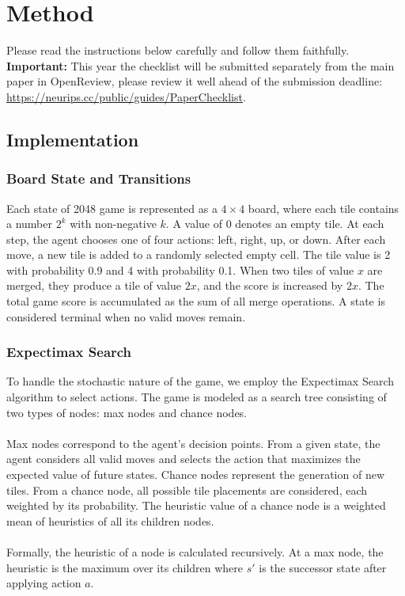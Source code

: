 \documentclass{article}
\begin{document}
\section{Method}


Please read the instructions below carefully and follow them faithfully. \textbf{Important:} This year the checklist will be submitted separately from the main paper in OpenReview, please review it well ahead of the submission deadline: \url{https://neurips.cc/public/guides/PaperChecklist}.


\subsection{Implementation}

\subsubsection{Board State and Transitions}

Each state of 2048 game is represented as a $4 \times 4$ board, where each tile contains a number $2^k$ with
non-negative $k$. A value of 0 denotes an empty tile. At each step, the agent chooses one of four actions:
left, right, up, or down. After each move, a new tile is added to a randomly selected empty cell.
The tile value is 2 with probability 0.9 and 4 with probability 0.1. When two tiles of value $x$ are merged,
they produce a tile of value $2x$, and the score is increased by $2x$. The total game score is accumulated
as the sum of all merge operations. A state is considered terminal when no valid moves remain.

\subsubsection{Expectimax Search}

To handle the stochastic nature of the game, we employ the Expectimax Search algorithm to select actions.
The game is modeled as a search tree consisting of two types of nodes: max nodes and chance nodes.
\\
\\
Max nodes correspond to the agent's decision points. From a given state, the agent considers all valid moves
and selects the action that maximizes the expected value of future states. Chance nodes represent the generation
of new tiles. From a chance node, all possible tile placements are considered, each weighted by its probability.
The heuristic value of a chance node is a weighted mean of heuristics of all its children nodes.
\\
\\
Formally, the heuristic of a node is calculated recursively. At a max node, the heuristic is the maximum over
its children where $s'$ is the successor state after applying action $a$.
\end{document}
